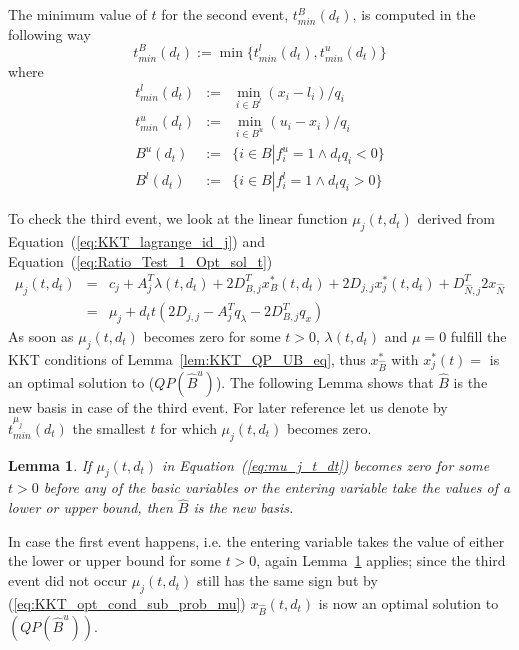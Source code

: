 \documentclass[a4paper]{article}
\newtheorem{lemma}{Lemma}
\begin{document}
The minimum value of $t$ for the second event, $t_{min}^{B}(d_{t})$, is computed
in the following way
\begin{equation}
t_{min}^{B}(d_{t}):=\min\{t_{min}^{l}(d_{t}), t_{min}^{u}(d_{t})\}
\end{equation}
where
\begin{eqnarray*}
t_{min}^{l}(d_{t})&:=& \min_{i \in B^{l}}\left(x_{i}-l_{i}\right)/q_{i} \\
t_{min}^{u}(d_{t})&:=& \min_{i \in B^{u}}\left(u_{i}-x_{i}\right)/q_{i} \\
B^{u}(d_{t})&:=&\{i \in B \left|\right. f_{i}^{u}=1 \wedge d_{t}q_{i}<0\} \\
B^{l}(d_{t})&:=&\{i \in B \left|\right. f_{i}^{l}=1 \wedge d_{t}q_{i}>0\} 
\end{eqnarray*} 

To check the third event, we look at the linear function $\mu_{j}(t,d_{t})$
derived from Equation~(\ref{eq:KKT_lagrange_id_j}) and
Equation~(\ref{eq:Ratio_Test_1_Opt_sol_t})
\begin{eqnarray}
\label{eq:mu_j_t_dt}
\mu_{j}(t, d_{t})
&=&
c_{j} + A_{j}^{T}\lambda(t, d_{t})+2D_{B,j}^{T}x_{B}^{*}(t, d_{t})
+2D_{j,j}x_{j}^{*}(t, d_{t})
+D_{\hat{N},j}^{T}2x_{\hat{N}} \nonumber \\
&=&
\mu_{j}+d_{t}t
\left(2D_{j,j}-A_{j}^{T}q_{\lambda}-2D_{B,j}^{T}q_{x}\right)
\end{eqnarray}
As soon as $\mu_{j}(t, d_{t})$ becomes zero for some $t > 0$,
$\lambda(t, d_{t})$ and $\mu=0$ fulfill the KKT conditions of
Lemma~\ref{lem:KKT_QP_UB_eq}, thus $x_{\hat{B}}^{*}$ with $x_{j}^{*}(t)=$ is 
an optimal solution to ($QP(\hat{B}^{u})$). The following Lemma shows that
$\hat{B}$ is the new basis in case of the third event.
For later reference let us denote by $t_{min}^{\mu_{j}}(d_{t})$ 
the smallest $t$ for which $\mu_{j}(t, d_{t})$
becomes zero.
\begin{lemma}
\label{lem:new_basis}
If $\mu_{j}(t, d_{t})$ in Equation~(\ref{eq:mu_j_t_dt}) becomes zero for some
$t > 0$ before any of the basic variables or the entering variable take the
values of a lower or upper bound, then $\hat{B}$ is the new basis.
\end{lemma}
In case the first event happens, i.e. the entering variable takes the value of
either the lower or upper bound for some $t>0$, again Lemma~\ref{lem:new_basis}
applies; since the third event did not occur $\mu_{j}(t, d_{t})$ still has the
same sign but by (\ref{eq:KKT_opt_cond_sub_prob_mu}) $x_{\hat{B}}(t, d_{t})$ is
now an optimal solution to $(QP(\hat{B}^{u}))$.
\end{document}
